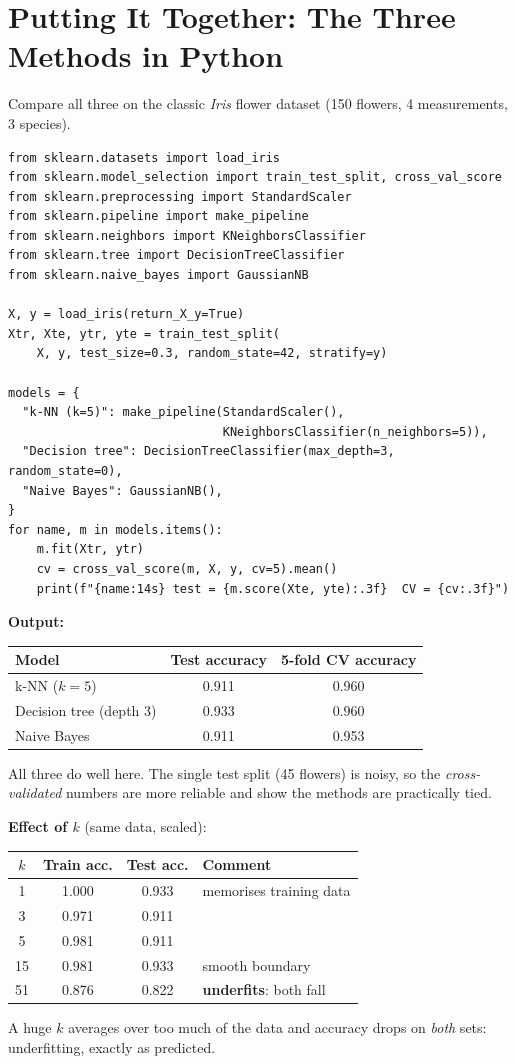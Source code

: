 \section{Putting It Together: The Three Methods in Python}

\begin{tryit}
Compare all three on the classic \emph{Iris} flower dataset (150 flowers, 4 measurements, 3 species).
\begin{lstlisting}
from sklearn.datasets import load_iris
from sklearn.model_selection import train_test_split, cross_val_score
from sklearn.preprocessing import StandardScaler
from sklearn.pipeline import make_pipeline
from sklearn.neighbors import KNeighborsClassifier
from sklearn.tree import DecisionTreeClassifier
from sklearn.naive_bayes import GaussianNB

X, y = load_iris(return_X_y=True)
Xtr, Xte, ytr, yte = train_test_split(
    X, y, test_size=0.3, random_state=42, stratify=y)

models = {
  "k-NN (k=5)": make_pipeline(StandardScaler(),
                              KNeighborsClassifier(n_neighbors=5)),
  "Decision tree": DecisionTreeClassifier(max_depth=3, random_state=0),
  "Naive Bayes": GaussianNB(),
}
for name, m in models.items():
    m.fit(Xtr, ytr)
    cv = cross_val_score(m, X, y, cv=5).mean()
    print(f"{name:14s} test = {m.score(Xte, yte):.3f}  CV = {cv:.3f}")
\end{lstlisting}
\textbf{Output:}
\begin{center}
\begin{tabular}{@{}lcc@{}}
\toprule
\textbf{Model} & \textbf{Test accuracy} & \textbf{5-fold CV accuracy}\\
\midrule
k-NN ($k=5$) & 0.911 & 0.960\\
Decision tree (depth 3) & 0.933 & 0.960\\
Naive Bayes & 0.911 & 0.953\\
\bottomrule
\end{tabular}
\end{center}
All three do well here. The single test split (45 flowers) is noisy, so the \emph{cross-validated} numbers are more reliable and show the methods are practically tied.

\medskip\noindent\textbf{Effect of $k$} (same data, scaled):
\begin{center}
\begin{tabular}{@{}cccl@{}}
\toprule
$k$ & Train acc. & Test acc. & Comment\\
\midrule
1 & 1.000 & 0.933 & memorises training data\\
3 & 0.971 & 0.911 & \\
5 & 0.981 & 0.911 & \\
15 & 0.981 & 0.933 & smooth boundary\\
51 & 0.876 & 0.822 & \textbf{underfits}: both fall\\
\bottomrule
\end{tabular}
\end{center}
A huge $k$ averages over too much of the data and accuracy drops on \emph{both} sets: underfitting, exactly as predicted.


\end{tryit}
